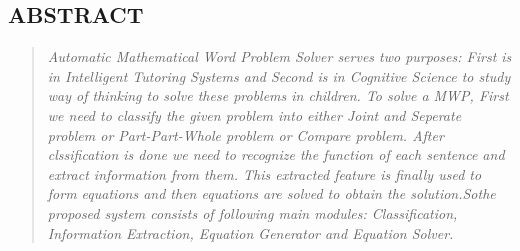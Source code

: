\begin{center}
\pagestyle{empty}
\begin{center}	
\begin{LARGE}
\section*{ABSTRACT}
\vspace{.15 in} 
\end{LARGE}
\end{center}
\begin{normalsize}
{\setlength{\baselineskip}{1.0\baselineskip}
\begin{quote}
 \textit{
Automatic Mathematical Word Problem Solver serves two purposes: First is in Intelligent Tutoring Systems and Second is in Cognitive Science to
study way of thinking to solve these problems in children. To solve a
MWP, First we need to classify the given problem into either Joint and
Seperate problem or Part-Part-Whole problem or Compare problem. After
clssification is done we need to recognize the function of each sentence
and extract information from them. This extracted feature is finally used
to form equations and then equations are solved to obtain the solution.Sothe proposed system consists of following main modules: Classification,
Information Extraction, Equation Generator and Equation Solver.
}
\end{quote}

}
\end{normalsize}
\end{center}
